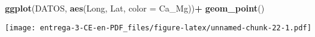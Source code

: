 \documentclass[
]{article}
\newenvironment{Shaded}{\begin{snugshade}}{\end{snugshade}}
\newcommand{\DataTypeTok}[1]{\textcolor[rgb]{0.13,0.29,0.53}{#1}}
\newcommand{\DecValTok}[1]{\textcolor[rgb]{0.00,0.00,0.81}{#1}}
\newcommand{\KeywordTok}[1]{\textcolor[rgb]{0.13,0.29,0.53}{\textbf{#1}}}
\newcommand{\NormalTok}[1]{#1}
\newcommand{\OperatorTok}[1]{\textcolor[rgb]{0.81,0.36,0.00}{\textbf{#1}}}
\newcommand{\StringTok}[1]{\textcolor[rgb]{0.31,0.60,0.02}{#1}}
\begin{document}
\begin{Shaded}
\begin{Highlighting}[]
\KeywordTok{ggplot}\NormalTok{(DATOS, }\KeywordTok{aes}\NormalTok{(Long, Lat, }\DataTypeTok{color =}\NormalTok{ Ca_Mg))}\OperatorTok{+}
\StringTok{  }\KeywordTok{geom_point}\NormalTok{()}
\end{Highlighting}
\end{Shaded}

\texttt{[image: entrega-3-CE-en-PDF\_files/figure-latex/unnamed-chunk-22-1.pdf]}

\begin{Shaded}
\end{Shaded}
\end{document}
